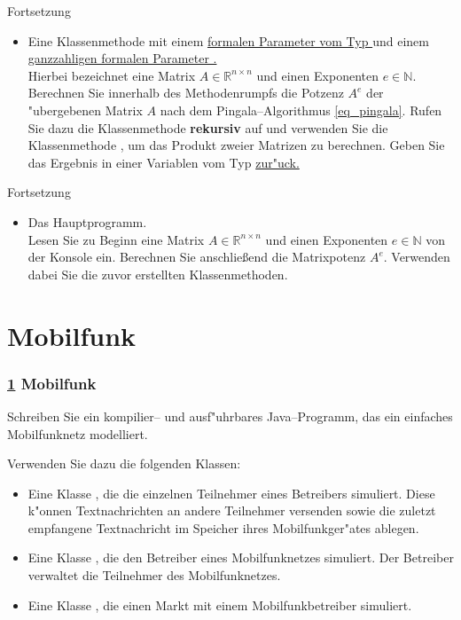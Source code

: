\documentclass[c,18pt]{beamer}
\begin{document}
\begin{frame}
Fortsetzung
\begin{itemize}
  \item Eine Klassenmethode  mit einem \underline{formalen Parameter \linebreak {} vom Typ  }
  und einem \underline{ganzzahligen formalen Parameter .}\\
  Hierbei bezeichnet  eine Matrix $A\in\mathbb R^{n\times n}$
  und  einen Exponenten $e\in\mathbb N$. Berechnen Sie innerhalb des Methodenrumpfs die Potzenz $A^e$ der
  "ubergebenen Matrix $A$ nach dem Pingala--Algorithmus \eqref{eq_pingala}. Rufen Sie dazu die Klassenmethode
   \textbf{rekursiv} auf und verwenden Sie die Klassenmethode , um das Produkt zweier
  Matrizen zu berechnen. Geben Sie das Ergebnis in einer Variablen vom Typ \underline{ zur"uck.}
\end{itemize}
\end{frame}

\begin{frame}
Fortsetzung
\begin{itemize}
  \item Das Hauptprogramm.\\
  Lesen Sie zu Beginn eine Matrix $A\in\mathbb R^{n\times n}$ und einen Exponenten $e\in\mathbb N$ von der Konsole ein.
  Berechnen Sie anschlie\ss end die Matrixpotenz $A^e$. Verwenden dabei Sie die zuvor erstellten Klassenmethoden.
\end{itemize}
\end{frame}


\def\stitle{Mobilfunk}
\section{\stitle}\label{S:mobil}
\begin{frame}[t]%
  \frametitle{\ref{S:mobil} \stitle}
Schreiben Sie ein kompilier-- und ausf"uhrbares Java--Programm, das ein einfaches Mobil\-funk\-netz
modelliert.


Verwenden Sie dazu die folgenden Klassen:
\begin{itemize}
\item
Eine Klasse , die die einzelnen Teilnehmer
eines Betreibers simuliert. Diese k"onnen Textnachrichten
an andere Teilnehmer versenden sowie die zuletzt empfangene
Textnachricht im Speicher ihres Mobilfunkger"ates ablegen.
\item
Eine Klasse , die den Betreiber
eines Mobilfunknetzes simuliert.
Der Betreiber verwaltet die Teilnehmer des Mobilfunknetzes.
\item
Eine Klasse , die einen Markt mit einem
Mobilfunkbetreiber simuliert.
\end{itemize}

\end{frame}
\end{document}
